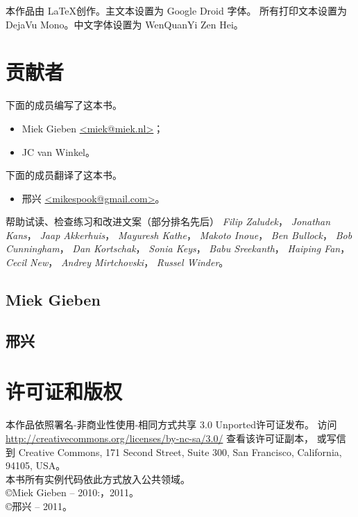 \noindent{}本作品由 \LaTeX 创作。主文本设置为 Google Droid 字体。
所有打印文本设置为 DejaVu Mono。中文字体设置为 WenQuanYi Zen Hei。

\section{贡献者}
下面的成员编写了这本书。
\begin{itemize}
\item{Miek Gieben \qquad\url{<miek@miek.nl>}}；
\item{JC van Winkel}。
\end{itemize}
下面的成员翻译了这本书。
\begin{itemize}
    \item{邢兴 \qquad\url{<mikespook@gmail.com>}}。
\end{itemize}

帮助试读、检查练习和改进文案（部分排名先后）
\emph{Filip Zaludek}，
\emph{Jonathan Kans}，
\emph{Jaap Akkerhuis}，
\emph{Mayuresh Kathe}，
\emph{Makoto Inoue}，
\emph{Ben Bullock}，
\emph{Bob Cunningham}，
\emph{Dan Kortschak}，
\emph{Sonia Keys}，
\emph{Babu Sreekanth}，
\emph{Haiping Fan}，
\emph{Cecil New}，
\emph{Andrey Mirtchovski}，
\emph{Russel Winder}。

\subsection{Miek Gieben}


\subsection{邢兴}


\section{许可证和版权}

本作品依照署名-非商业性使用-相同方式共享 3.0 Unported许可证发布。
访问 \url{http://creativecommons.org/licenses/by-nc-sa/3.0/} 查看该许可证副本，
或写信到 Creative Commons, 171 Second Street, Suite 300,
San Francisco, California, 94105, USA。\\
本书所有实例代码依此方式放入公共领域。\\
\copyright Miek Gieben -- 2010:，2011。\\
\copyright 邢兴 -- 2011。

